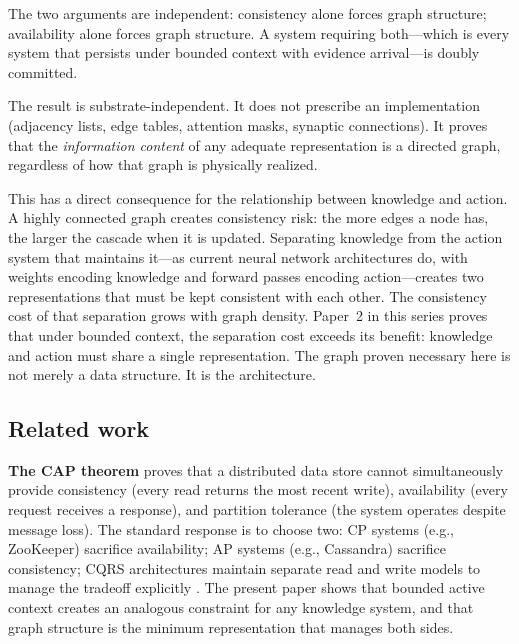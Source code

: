 \documentclass[11pt]{article}
\theoremstyle{definition}
\begin{document}
The two arguments are independent: consistency alone forces graph
structure; availability alone forces graph structure. A system
requiring both---which is every system that persists under bounded
context with evidence arrival---is doubly committed.

The result is substrate-independent. It does not prescribe an
implementation (adjacency lists, edge tables, attention masks, synaptic
connections). It proves that the \emph{information content} of any
adequate representation is a directed graph, regardless of how that
graph is physically realized.

This has a direct consequence for the relationship between knowledge
and action. A highly connected graph creates consistency risk:
the more edges a node has, the larger the cascade when it is
updated. Separating knowledge from the action system that maintains
it---as current neural network architectures do, with weights
encoding knowledge and forward passes encoding action---creates two
representations that must be kept consistent with each other.
The consistency cost of that separation grows with graph density.
Paper~2 in this series \cite{McCarthy2026b} proves that under
bounded context, the separation cost exceeds its benefit: knowledge
and action must share a single representation. The graph proven
necessary here is not merely a data structure. It is the
architecture.

\subsection{Related work}

\textbf{The CAP theorem} \cite{Brewer2000, Gilbert2002} proves that a
distributed data store cannot simultaneously provide consistency
(every read returns the most recent write), availability (every
request receives a response), and partition tolerance (the system
operates despite message loss). The standard response is to choose
two: CP systems (e.g., ZooKeeper) sacrifice availability; AP systems
(e.g., Cassandra) sacrifice consistency; CQRS architectures maintain
separate read and write models to manage the tradeoff explicitly
\cite{Young2010}. The present paper shows that bounded active context
creates an analogous constraint for any knowledge system, and that
graph structure is the minimum representation that manages both sides.
\end{document}

